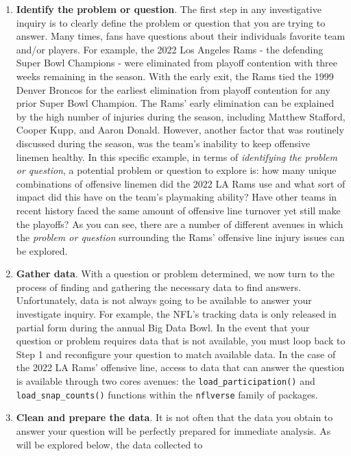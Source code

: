 \documentclass[
  letterpaper,
]{krantz}
\begin{document}
\begin{enumerate}
\def\labelenumi{\arabic{enumi}.}
\item
  \textbf{Identify the problem or question}. The first step in any
  investigative inquiry is to clearly define the problem or question
  that you are trying to answer. Many times, fans have questions about
  their individuals favorite team and/or players. For example, the 2022
  Los Angeles Rams - the defending Super Bowl Champions - were
  eliminated from playoff contention with three weeks remaining in the
  season. With the early exit, the Rams tied the 1999 Denver Broncos for
  the earliest elimination from playoff contention for any prior Super
  Bowl Champion. The Rams' early elimination can be explained by the
  high number of injuries during the season, including Matthew Stafford,
  Cooper Kupp, and Aaron Donald. However, another factor that was
  routinely discussed during the season, was the team's inability to
  keep offensive linemen healthy. In this specific example, in terms of
  \emph{identifying the problem or question}, a potential problem or
  question to explore is: how many unique combinations of offensive
  linemen did the 2022 LA Rams use and what sort of impact did this have
  on the team's playmaking ability? Have other teams in recent history
  faced the same amount of offensive line turnover yet still make the
  playoffs? As you can see, there are a number of different avenues in
  which the \emph{problem or question} surrounding the Rams' offensive
  line injury issues can be explored.
\item
  \textbf{Gather data}. With a question or problem determined, we now
  turn to the process of finding and gathering the necessary data to
  find answers. Unfortunately, data is not always going to be available
  to answer your investigate inquiry. For example, the NFL's tracking
  data is only released in partial form during the annual Big Data Bowl.
  In the event that your question or problem requires data that is not
  available, you must loop back to Step 1 and reconfigure your question
  to match available data. In the case of the 2022 LA Rams' offensive
  line, access to data that can answer the question is available through
  two cores avenues: the \texttt{load\_participation()} and
  \texttt{load\_snap\_counts()} functions within the \texttt{nflverse}
  family of packages.
\item
  \textbf{Clean and prepare the data}. It is not often that the data you
  obtain to answer your question will be perfectly prepared for
  immediate analysis. As will be explored below, the data collected to

\end{enumerate}
\end{document}
